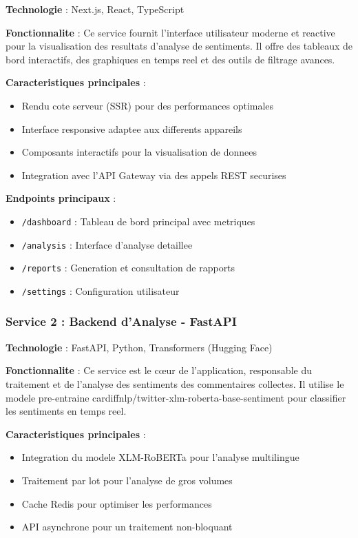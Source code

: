 \textbf{Technologie} : Next.js, React, TypeScript

\textbf{Fonctionnalite} : Ce service fournit l'interface utilisateur moderne et reactive pour la visualisation des resultats d'analyse de sentiments. Il offre des tableaux de bord interactifs, des graphiques en temps reel et des outils de filtrage avances.

\textbf{Caracteristiques principales} :
\begin{itemize}
    \item Rendu cote serveur (SSR) pour des performances optimales
    \item Interface responsive adaptee aux differents appareils
    \item Composants interactifs pour la visualisation de donnees
    \item Integration avec l'API Gateway via des appels REST securises
\end{itemize}

\textbf{Endpoints principaux} :
\begin{itemize}
    \item \texttt{/dashboard} : Tableau de bord principal avec metriques
    \item \texttt{/analysis} : Interface d'analyse detaillee
    \item \texttt{/reports} : Generation et consultation de rapports
    \item \texttt{/settings} : Configuration utilisateur
\end{itemize}

\subsubsection{Service 2 : Backend d'Analyse - FastAPI}

\textbf{Technologie} : FastAPI, Python, Transformers (Hugging Face)

\textbf{Fonctionnalite} : Ce service est le cœur de l'application, responsable du traitement et de l'analyse des sentiments des commentaires collectes. Il utilise le modele pre-entraine cardiffnlp/twitter-xlm-roberta-base-sentiment pour classifier les sentiments en temps reel.

\textbf{Caracteristiques principales} :
\begin{itemize}
    \item Integration du modele XLM-RoBERTa pour l'analyse multilingue
    \item Traitement par lot pour l'analyse de gros volumes
    \item Cache Redis pour optimiser les performances
    \item API asynchrone pour un traitement non-bloquant
\end{itemize}

